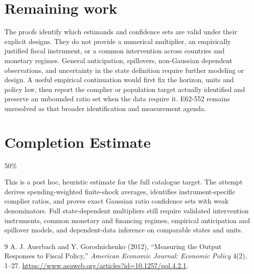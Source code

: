 \documentclass[11pt]{article}
\theoremstyle{definition}
\begin{document}
\section*{Remaining work}
The proofs identify which estimands and confidence sets are valid under their explicit designs. They do not provide a numerical multiplier, an empirically justified fiscal instrument, or a common intervention across countries and monetary regimes. General anticipation, spillovers, non-Gaussian dependent observations, and uncertainty in the state definition require further modeling or design. A useful empirical continuation would first fix the horizon, units and policy law, then report the complier or population target actually identified and preserve an unbounded ratio set when the data require it. E62-552 remains unresolved as that broader identification and measurement agenda.

\section{Completion Estimate}
50\%

This is a post hoc, heuristic estimate for the full catalogue target.
The attempt derives spending-weighted finite-shock averages, identifies instrument-specific complier ratios, and proves exact Gaussian ratio confidence sets with weak denominators. Full state-dependent multipliers still require validated intervention instruments, common monetary and financing regimes, empirical anticipation and spillover models, and dependent-data inference on comparable states and units.

\begin{thebibliography}{9}
 A. J. Auerbach and Y. Gorodnichenko (2012), ``Measuring the Output Responses to Fiscal Policy,'' \emph{American Economic Journal: Economic Policy} 4(2), 1--27. \url{https://www.aeaweb.org/articles?id=10.1257/pol.4.2.1}.
\end{thebibliography}
\end{document}
